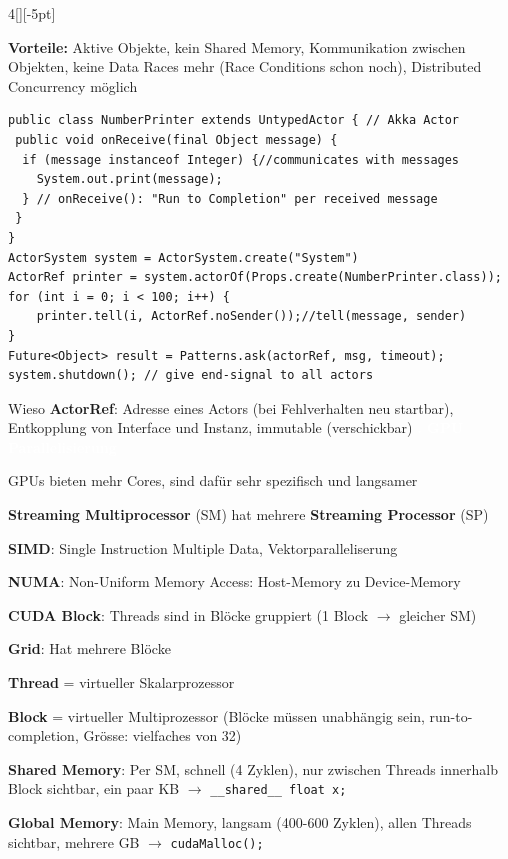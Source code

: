 \documentclass[%
	pdftex,%
	a4paper,%
	landscape,%
	ngerman,
	oneside,%
	6pt,%
	halfparskip,%
]{scrbook}
\newenvironment{mainbox}{%
  \def\FrameCommand{\fboxrule 1px \fcolorbox{black}{spec_blue}}%
  \MakeFramed {\advance\hsize-\width \FrameRestore}}%
 {\endMakeFramed}
\newcommand{\maintopic}[1]{\setcounter{subtopicenum}{0}\setcounter{subsubtopicenum}{0}\vspace{-4px}\begin{mainbox}\textcolor{white}{\textbf{\large{\stepcounter{maintopicenum}\Roman{maintopicenum}. #1}}}\end{mainbox}\vspace{-4px}}
\newenvironment{tight-itemize}
{ \begin{itemize}[leftmargin=*, nosep]
    \setlength{\itemsep}{0px}
    \setlength{\parskip}{0px}
    \setlength{\parsep}{0px}  }
{ \end{itemize}                  }
\begin{document}
\begin{multicols}{4}[][-5pt]
\begin{tight-itemize}
	\item{\textbf{Vorteile:} Aktive Objekte, kein Shared Memory, Kommunikation zwischen Objekten, keine Data Races mehr (Race Conditions schon noch), Distributed Concurrency möglich}
\end{tight-itemize}
\begin{lstlisting}
public class NumberPrinter extends UntypedActor { // Akka Actor
 public void onReceive(final Object message) {
  if (message instanceof Integer) {//communicates with messages
    System.out.print(message);
  } // onReceive(): "Run to Completion" per received message
 }
}
ActorSystem system = ActorSystem.create("System")
ActorRef printer = system.actorOf(Props.create(NumberPrinter.class));
for (int i = 0; i < 100; i++) {
    printer.tell(i, ActorRef.noSender());//tell(message, sender)
}
Future<Object> result = Patterns.ask(actorRef, msg, timeout);
system.shutdown(); // give end-signal to all actors
\end{lstlisting}
Wieso \textbf{ActorRef}: Adresse eines Actors (bei Fehlverhalten neu startbar), Entkopplung von Interface und Instanz, immutable (verschickbar)
\maintopic{GPU Parallelisierung}
\begin{tight-itemize}
	\item{GPUs bieten mehr Cores, sind dafür sehr spezifisch und langsamer}
	\item{\textbf{Streaming Multiprocessor} (SM) hat mehrere \textbf{Streaming Processor} (SP)}
  	\item{\textbf{SIMD}: Single Instruction Multiple Data, Vektorparalleliserung}
    \item{\textbf{NUMA}: Non-Uniform Memory Access: Host-Memory zu Device-Memory}
    \item{\textbf{CUDA Block}: Threads sind in Blöcke gruppiert (1 Block $\rightarrow$ gleicher SM)}
    \item{\textbf{Grid}: Hat mehrere Blöcke}
    \item{\textbf{Thread} = virtueller Skalarprozessor}
    \item{\textbf{Block} = virtueller Multiprozessor (Blöcke müssen unabhängig sein, run-to-completion, Grösse: vielfaches von 32)}
    \item{\textbf{Shared Memory}: Per SM, schnell (4 Zyklen), nur zwischen Threads innerhalb Block sichtbar, ein paar KB $\rightarrow$ \lstinline|__shared__ float x;|}
    \item{\textbf{Global Memory}: Main Memory, langsam (400-600 Zyklen), allen Threads sichtbar, mehrere GB $\rightarrow$ \lstinline|cudaMalloc();|}

\end{tight-itemize}
\end{multicols}
\end{document}
